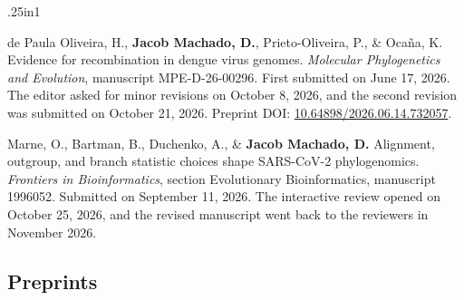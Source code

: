 \documentclass[11pt, letterpaper, sans]{moderncv}
\begin{document}
	{\setlength{\parskip}{.5em}\renewcommand{\baselinestretch}{2.0}\begin{hangparas}{.25in}{1}

        de Paula Oliveira, H., \textbf{Jacob Machado, D.}, Prieto-Oliveira, P., \& Ocaña, K. Evidence for recombination in dengue virus genomes. \textit{Molecular Phylogenetics and Evolution}, manuscript MPE-D-26-00296. First submitted on June 17, 2026. The editor asked for minor revisions on October 8, 2026, and the second revision was submitted on October 21, 2026. Preprint DOI: \href{https://doi.org/10.64898/2026.06.14.732057}{10.64898/2026.06.14.732057}.

        Marne, O., Bartman, B., Duchenko, A., \& \textbf{Jacob Machado, D.} Alignment, outgroup, and branch statistic choices shape SARS-CoV-2 phylogenomics. \textit{Frontiers in Bioinformatics}, section Evolutionary Bioinformatics, manuscript 1996052. Submitted on September 11, 2026. The interactive review opened on October 25, 2026, and the revised manuscript went back to the reviewers in November 2026.

	\end{hangparas}}


\subsection{Preprints}
\end{document}
